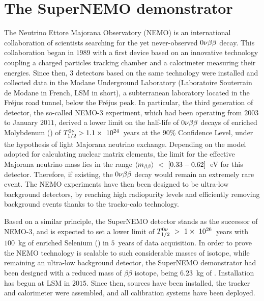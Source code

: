 \chapter{The SuperNEMO demonstrator}
\label{ch:detector}

The Neutrino Ettore Majorana Observatory (NEMO) is an international collaboration of scientists searching for the yet never-observed $0\nu\beta\beta$ decay.
This collaboration began in $1989$ with a first device based on an innovative technology coupling a charged particles tracking chamber and a calorimeter measuring their energies.
Since then, $3$ detectors based on the same technology were installed and collected data in the Modane Underground Laboratory (Laboratoire Souterrain de Modane in French, LSM in short), a subterranean laboratory located in the Fréjus road tunnel, below the Fréjus peak.
In particular, the third generation of detector, the so-called NEMO-$3$ experiment, which had been operating from $2003$ to January $2011$, derived a lower limit on the half-life of $0\nu\beta\beta$ decays of enriched Molybdenum (\Mo) of $T_{1/2}^{0\nu}>1.1\times~10^{24}$~years at the $90$\% Confidence Level, under the hypothesis of light Majorana neutrino exchange.
Depending on the model adopted for calculating nuclear matrix elements, the limit for the effective Majorana neutrino mass lies in the range $\langle m_{\beta\beta}\rangle~<~[0.33-0.62]$~eV for this detector.
Therefore, if existing, the $0\nu\beta\beta$ decay would remain an extremely rare event.
The NEMO experiments have then been designed to be ultra-low background detectors, by reaching high radiopurity levels and efficiently removing background events thanks to the tracko-calo technology.

Based on a similar principle, the SuperNEMO detector stands as the successor of NEMO-$3$, and is expected to set a lower limit of $T_{1/2}^{0\nu}~>~1\times~10^{26}$~years with $100$~kg of enriched Selenium (\Se) in $5$~years of data acquisition.
In order to prove the NEMO technology is scalable to such considerable masses of isotope, while remaining an ultra-low background detector, the SuperNEMO demonstrator had been designed with a reduced mass of $\beta\beta$ isotope, being $6.23$~kg of \Se.
Installation has begun at LSM in $2015$.
Since then, sources have been installed, the tracker and calorimeter were assembled, and all calibration systems have been deployed.

